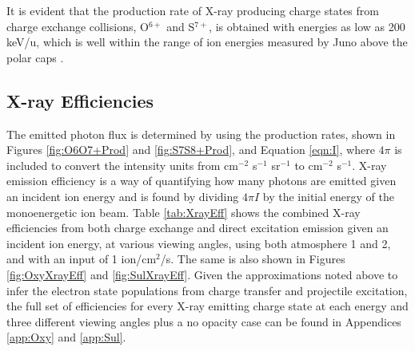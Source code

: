 \documentclass[draft]{agujournal2018}
\begin{document}
It is evident that the production rate of X-ray producing charge states from charge exchange collisions, O$^{6+}$ and S$^{7+}$, is obtained with energies as low as 200 keV/u, which is well within the range of ion energies measured by Juno above the polar caps \citep{haggerty2017,clark2017a,clark2017b}.

\subsection{X-ray Efficiencies}

The emitted photon flux is determined by using the production rates, shown in Figures \ref{fig:O6O7+Prod} and \ref{fig:S7S8+Prod}, and Equation \ref{eqn:I}, where $4\pi$ is included to convert the intensity units from cm$^{-2}$ s$^{-1}$ sr$^{-1}$ to cm$^{-2}$ s$^{-1}$.
X-ray emission efficiency is a way of quantifying how many photons are emitted given an incident ion energy and is found by dividing $4\pi I$ by the initial energy of the monoenergetic ion beam.
Table \ref{tab:XrayEff} shows the combined X-ray efficiencies from both charge exchange and direct excitation emission given an incident ion energy, at various viewing angles, using both atmosphere 1 and 2, and with an input of 1 ion/cm$^2$/s.
The same is also shown in Figures \ref{fig:OxyXrayEff} and \ref{fig:SulXrayEff}.
Given the approximations noted above to infer the electron state populations from charge transfer and projectile excitation, the full set of efficiencies for every X-ray emitting charge state at each energy and three different viewing angles plus a no opacity case can be found in Appendices \ref{app:Oxy} and \ref{app:Sul}.
\end{document}
